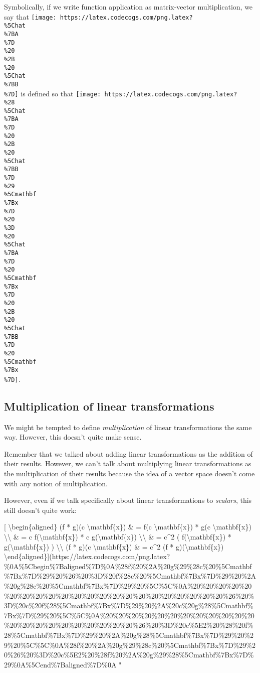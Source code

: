 \documentclass[]{article}
\begin{document}
Symbolically, if we write function application as matrix-vector multiplication,
we say that
\texttt{[image: https://latex.codecogs.com/png.latex?\\\%5Chat\\\%7BA\\\%7D\\\%20\\\%2B\\\%20\\\%5Chat\\\%7BB\\\%7D]}
is defined so that
\texttt{[image: https://latex.codecogs.com/png.latex?\\\%28\\\%5Chat\\\%7BA\\\%7D\\\%20\\\%2B\\\%20\\\%5Chat\\\%7BB\\\%7D\\\%29\\\%5Cmathbf\\\%7Bx\\\%7D\\\%20\\\%3D\\\%20\\\%5Chat\\\%7BA\\\%7D\\\%20\\\%5Cmathbf\\\%7Bx\\\%7D\\\%20\\\%2B\\\%20\\\%5Chat\\\%7BB\\\%7D\\\%20\\\%5Cmathbf\\\%7Bx\\\%7D]}.

\hypertarget{multiplication-of-linear-transformations}{%
\subsection{Multiplication of linear
transformations}\label{multiplication-of-linear-transformations}}

We might be tempted to define \emph{multiplication} of linear transformations
the same way. However, this doesn't quite make sense.

Remember that we talked about adding linear transformations as the addition of
their results. However, we can't talk about multiplying linear transformations
as the multiplication of their results because the idea of a vector space
doesn't come with any notion of multiplication.

However, even if we talk specifically about linear transformations to
\emph{scalars}, this still doesn't quite work:

{[} \textbackslash{}begin\{aligned\} (f * g)(c \textbackslash{}mathbf\{x\}) \& =
f(c \textbackslash{}mathbf\{x\}) * g(c \textbackslash{}mathbf\{x\})
\textbackslash{}\textbackslash{} \& = c f(\textbackslash{}mathbf\{x\}) * c
g(\textbackslash{}mathbf\{x\}) \textbackslash{}\textbackslash{} \& = c\^{}2 (
f(\textbackslash{}mathbf\{x\}) * g(\textbackslash{}mathbf\{x\}) )
\textbackslash{}\textbackslash{} (f * g)(c \textbackslash{}mathbf\{x\}) \& =
c\^{}2 (f * g)(\textbackslash{}mathbf\{x\})
\textbackslash{}end\{aligned\}{]}(https://latex.codecogs.com/png.latex?\%0A\%5Cbegin\%7Baligned\%7D\%0A\%28f\%20\%2A\%20g\%29\%28c\%20\%5Cmathbf\%7Bx\%7D\%29\%20\%26\%20\%3D\%20f\%28c\%20\%5Cmathbf\%7Bx\%7D\%29\%20\%2A\%20g\%28c\%20\%5Cmathbf\%7Bx\%7D\%29\%20\%5C\%5C\%0A\%20\%20\%20\%20\%20\%20\%20\%20\%20\%20\%20\%20\%20\%20\%20\%20\%20\%20\%20\%20\%20\%20\%26\%20\%3D\%20c\%20f\%28\%5Cmathbf\%7Bx\%7D\%29\%20\%2A\%20c\%20g\%28\%5Cmathbf\%7Bx\%7D\%29\%20\%5C\%5C\%0A\%20\%20\%20\%20\%20\%20\%20\%20\%20\%20\%20\%20\%20\%20\%20\%20\%20\%20\%20\%20\%20\%20\%26\%20\%3D\%20c\%5E2\%20\%28\%20f\%28\%5Cmathbf\%7Bx\%7D\%29\%20\%2A\%20g\%28\%5Cmathbf\%7Bx\%7D\%29\%20\%29\%20\%5C\%5C\%0A\%28f\%20\%2A\%20g\%29\%28c\%20\%5Cmathbf\%7Bx\%7D\%29\%20\%26\%20\%3D\%20c\%5E2\%20\%28f\%20\%2A\%20g\%29\%28\%5Cmathbf\%7Bx\%7D\%29\%0A\%5Cend\%7Baligned\%7D\%0A
"
\end{document}
